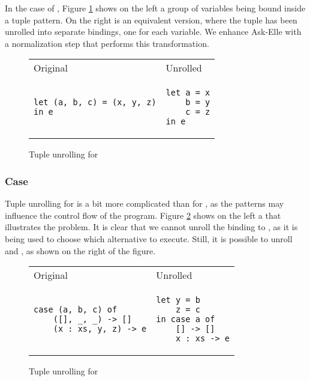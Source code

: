 In the case of , Figure \ref{fig:patterns-tuple-unrolling-let} shows on the left a group of variables being bound inside a tuple pattern. On the right is an equivalent version, where the tuple has been unrolled into separate bindings, one for each variable. We enhance Ask-Elle with a normalization step that performs this transformation.



\begin{figure}
\centering
\begin{tabular}{ >{\centering\arraybackslash}m{14em} >{\centering\arraybackslash}m{8em}}
Original & Unrolled \\
\begin{verbatim}
let (a, b, c) = (x, y, z)
in e
\end{verbatim}
& \begin{verbatim}
let a = x
    b = y
    c = z
in e
\end{verbatim}
\end{tabular}
\caption{Tuple unrolling for }
\label{fig:patterns-tuple-unrolling-let}
\end{figure}

\subsubsection{Case}

Tuple unrolling for  is a bit more complicated than for , as the patterns may influence the control flow of the program. Figure \ref{fig:patterns-tuple-unrolling-case} shows on the left a  that illustrates the problem. It is clear that we cannot unroll the binding to , as it is being used to choose which alternative to execute. Still, it is possible to unroll  and , as shown on the right of the figure.

\begin{figure}
\centering
\begin{tabular}{ >{\centering\arraybackslash}m{14em} >{\centering\arraybackslash}m{8em} }
Original & Unrolled \\
\begin{verbatim}
case (a, b, c) of
    ([], _, _) -> []
    (x : xs, y, z) -> e
\end{verbatim}
& \begin{verbatim}
let y = b
    z = c
in case a of
    [] -> []
    x : xs -> e
\end{verbatim}
\end{tabular}
\caption{Tuple unrolling for }
\label{fig:patterns-tuple-unrolling-case}
\end{figure}

